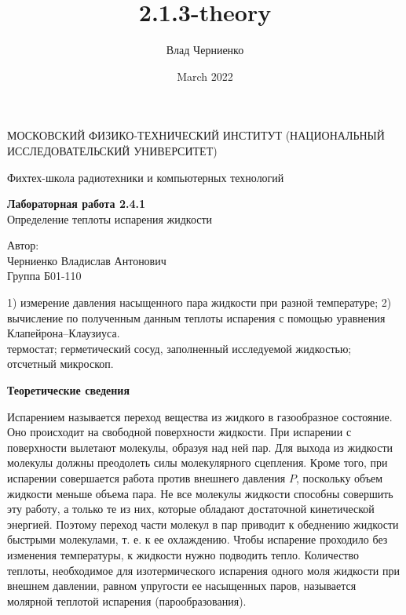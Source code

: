 \documentclass[a4paper, 12pt]{article}
\title{2.1.3-theory}
\author{Влад Черниенко}
\date{March 2022}
\begin{document}
    \begin{titlepage}
    
        \begin{center}
            {\large МОСКОВСКИЙ ФИЗИКО-ТЕХНИЧЕСКИЙ ИНСТИТУТ (НАЦИОНАЛЬНЫЙ ИССЛЕДОВАТЕЛЬСКИЙ УНИВЕРСИТЕТ)}
        \end{center}
        \begin{center}
            {\large Фихтех-школа радиотехники и компьютерных технологий}
        \end{center}
        
        \vspace{4.5cm}
        
        {\huge
            \begin{center}
                {\bf Лабораторная работа 2.4.1} \\
                Определение теплоты испарения жидкости
            \end{center}
        }
        
        \vspace{12cm}
        
        \begin{flushright}
            {\LARGE Автор: \\ Черниенко Владислав Антонович \\ \vspace{0.2cm} Группа Б01-110}
        \end{flushright}
        
    \end{titlepage}
    
    
     1) измерение давления насыщенного пара жидкости при разной температуре; 2) вычисление по полученным данным теплоты испарения с помощью уравнения Клапейрона–Клаузиуса.\\
    
     термостат; герметический сосуд, заполненный исследуемой жидкостью; отсчетный микроскоп.\\
    
    \begin{flushleft}
        {\Large {\bf Теоретические сведения}}
    \end{flushleft}
    
    Испарением называется переход вещества из жидкого в газообразное состояние. Оно происходит на свободной поверхности жидкости. При испарении с поверхности вылетают молекулы, образуя над ней пар. Для выхода из жидкости молекулы должны преодолеть силы молекулярного сцепления. Кроме того, при испарении совершается работа против внешнего давления $P$, поскольку объем жидкости меньше объема пара. Не все молекулы жидкости способны совершить эту работу, а только те из них, которые обладают достаточной кинетической энергией. Поэтому переход части молекул в пар приводит к обеднению жидкости быстрыми молекулами, т. е. к ее охлаждению. Чтобы испарение проходило без изменения температуры, к жидкости нужно подводить тепло. Количество теплоты, необходимое для изотермического испарения одного моля жидкости при внешнем давлении, равном упругости ее насыщенных паров, называется молярной теплотой испарения (парообразования).
    
\end{document}
